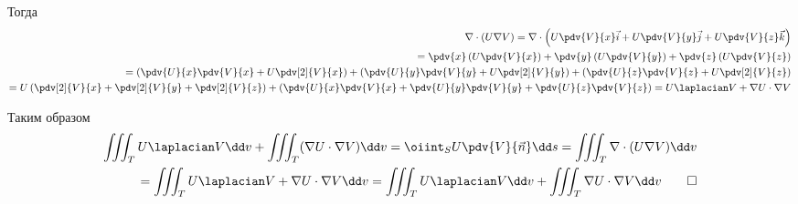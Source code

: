 Тогда
\[
\begin{split}
  \nabla \cdot (U \nabla V)
  = \nabla \cdot \left(U \pdv{V}{x} \vec{i} + U \pdv{V}{y} \vec{j} + U \pdv{V}{z} \vec{k}\right) \\
  = \pdv{x} \left(U \pdv{V}{x}\right)
  + \pdv{y} \left(U \pdv{V}{y}\right)
  + \pdv{z} \left(U \pdv{V}{z}\right) \\
  = \left(\pdv{U}{x} \pdv{V}{x} + U \pdv[2]{V}{x}\right)
  + \left(\pdv{U}{y} \pdv{V}{y} + U \pdv[2]{V}{y}\right)
  + \left(\pdv{U}{z} \pdv{V}{z} + U \pdv[2]{V}{z}\right) \\
  = U\left(\pdv[2]{V}{x} + \pdv[2]{V}{y} + \pdv[2]{V}{z}\right)
  + \left(\pdv{U}{x} \pdv{V}{x} + \pdv{U}{y} \pdv{V}{y} + \pdv{U}{z} \pdv{V}{z}\right)
  = U \laplacian V + \nabla U \cdot \nabla V
\end{split}
\]

Таким образом
\[
\begin{split}
  \iiint_{T} U \laplacian V \dd v
  + \iiint_{T} (\nabla U \cdot \nabla V) \dd v
  = \oiint_{S} U \pdv{V}{\vec{n}} \dd s
  = \iiint_{T} \nabla \cdot (U \nabla V) \dd v \\
  = \iiint_{T} U \laplacian V + \nabla U \cdot \nabla V \dd v
  = \iiint_{T} U \laplacian V \dd v + \iiint_{T} \nabla U \cdot \nabla V \dd v
  \qed
\end{split}
\]
